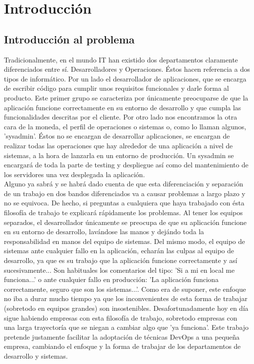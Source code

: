 \chapter {Introducción}
\section{Introducción al problema}

	\begin{paragraph}
			 Tradicionalmente, en el mundo IT han existido dos departamentos claramente diferenciados entre sí. Desarrolladores y Operaciones. Éstos hacen referencia a dos tipos de informático. Por un lado el desarrollador de aplicaciones, que se encarga de escribir código para cumplir unos requisitos funcionales y darle forma al producto. Este primer grupo se caracteriza por únicamente preocuparse de que la aplicación funcione correctamente en su entorno de desarrollo y que cumpla las funcionalidades descritas por el cliente. Por otro lado nos encontramos la otra cara de la moneda, el perfil de operaciones o sistemas o, como lo llaman algunos, 'sysadmin'. Éstos no se encargan de desarrollar aplicaciones, se encargan de realizar todas las operaciones que hay alrededor de una aplicación a nivel de sistemas, a la hora de lanzarla en un entorno de producción. Un sysadmin se encargará de toda la parte de testing y despliegue así como del mantenimiento de los servidores una vez desplegada la aplicación. \\
			 Alguno ya sabrá y se habrá dado cuenta de que esta diferenciación y separación de un trabajo en dos bandos diferenciados va a causar problemas a largo plazo y no se equivoca. De hecho, si preguntas a cualquiera que haya trabajado con ésta filosofía de trabajo te explicará rápidamente los problemas. Al tener los equipos separados, el desarrollador únicamente se preocupa de que su aplicación funcione en su entorno de desarrollo, lavándose las manos y dejándo toda la responsabilidad en manos del equipo de sistemas. Del mismo modo, el equipo de sistemas ante cualquier fallo en la aplicación, echarán las culpas al equipo de desarrollo, ya que es su trabajo que la aplicación funcione correctamente y así sucesivamente... Son habituales los comentarios del tipo: 'Si a mi en local me funciona...' o ante cualquier fallo en producción: 'La aplicación funciona correctamente, seguro que son los sistemas...'. Como era de suponer, este enfoque no iba a durar mucho tiempo ya que los inconvenientes de esta forma de trabajar (sobretodo en equipos grandes) son insostenibles. Desafortunadamente hoy en día sigue habiendo empresas con esta filosofía de trabajo, sobretodo empresas con una larga trayectoría que se niegan a cambiar algo que 'ya funciona'. Este trabajo pretende justamente facilitar la adoptación de técnicas DevOps a una pequeña empresa, cambiando el enfoque y la forma de trabajar de los departamentos de desarrollo y sistemas.
	\end{paragraph}

